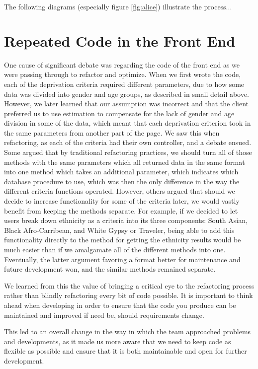 \documentclass{l3proj}
\begin{document}
 


The following diagrams (especially figure \ref{fig:alice}) illustrate the
process...

\section{Repeated Code in the Front End}
\label{repeated}

One cause of significant debate was regarding the code of the front end as we were passing through to refactor and optimize. When we first wrote the code, each of the deprivation criteria required different parameters, due to how some data was divided into gender and age groups, as described in small detail above. However, we later learned that our assumption was incorrect and that the client preferred us to use estimation to compensate for the lack of gender and age division in some of the data, which meant that each deprivation criterion took in the same parameters from another part of the page. We saw this when refactoring, as each of the criteria had their own controller, and a debate ensued. Some argued that by traditional refactoring practices, we should turn all of those methods with the same parameters which all returned data in the same format into one method which takes an additional parameter, which indicates which database procedure to use, which was then the only difference in the way the different criteria functions operated. However, others argued that should we decide to increase functionality for some of the criteria later, we would vastly benefit from keeping the methods separate. For example, if we decided to let users break down ethnicity as a criteria into its three components: South Asian, Black Afro-Carribean, and White Gypsy or Traveler, being able to add this functionality directly to the method for getting the ethnicity results would be much easier than if we amalgamate all of the different methods into one. Eventually, the latter argument favoring a format better for maintenance and future development won, and the similar methods remained separate.

We learned from this the value of bringing a critical eye to the refactoring process rather than blindly refactoring every bit of code possible. It is important to think ahead when developing in order to ensure that the code you produce can be maintained and improved if need be, should requirements change.

This led to an overall change in the way in which the team approached problems and developments, as it made us more aware that we need to keep code as flexible as possible and ensure that it is both maintainable and open for further development.
\end{document}

